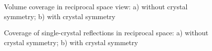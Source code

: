 \documentclass[final]{iucr}              %
\begin{document}
\begin{figure}
\caption{Volume coverage in reciprocal space view: a) without crystal symmetry;
b) with crystal symmetry}
\label{fig:volume_view}
\end{figure}


\begin{figure}
\caption{Coverage of single-crystal reflections in reciprocal space: a) without
crystal symmetry; b) with crystal symmetry}
\label{fig:refl_view}
\end{figure}
\end{document}
